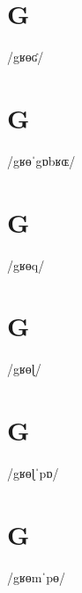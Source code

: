 \documentclass[10pt,a4paper,twoside]{book}
\begin{document}
\section*{G}

\begin{multicols}{3}
 {/gʁɵʛ/} {}
\end{multicols}

\section*{G}

\begin{multicols}{3}
 {/gʁɵˈgɒbʁɶ/} {}
\end{multicols}

\section*{G}

\begin{multicols}{3}
 {/gʁɵq/} {}
\end{multicols}

\section*{G}

\begin{multicols}{3}
 {/gʁɵɭ/} {}
\end{multicols}

\section*{G}

\begin{multicols}{3}
 {/gʁɵɭˈpɒ/} {}
\end{multicols}

\section*{G}

\begin{multicols}{3}
 {/gʁɵmˈpɵ/} {}
\end{multicols}
\end{document}
